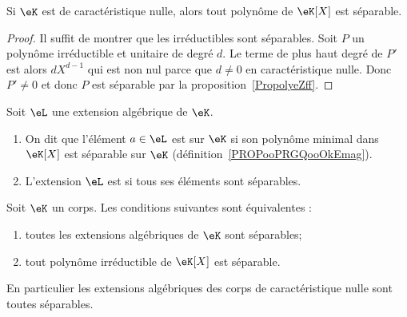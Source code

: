 \begin{corollary}   \label{CorUjfJSE}
	Si \( \eK\) est de caractéristique nulle, alors tout polynôme de \( \eK[X]\) est séparable.
\end{corollary}

\begin{proof}
	Il suffit de montrer que les irréductibles sont séparables. Soit \( P\) un polynôme irréductible et unitaire de degré \( d\). Le terme de plus haut degré de \( P'\) est alors \( dX^{d-1}\) qui est non nul parce que \( d\neq 0\) en caractéristique nulle. Donc \( P'\neq 0\) et donc \( P\) est séparable par la proposition~\ref{PropolyeZff}.
\end{proof}

\begin{definition}      \label{DEFooKTVHooTydOTM}
	Soit \( \eL\) une extension algébrique de \( \eK\).
	\begin{enumerate}
		\item       \label{ITEMooOFYPooLYkIPr}
		      On dit que l'élément \( a\in \eL\) est  sur \( \eK\) si son polynôme minimal dans \( \eK[X]\) est séparable sur \( \eK\) (définition~\ref{PROPooPRGQooOkEmag}).
		\item
		      L'extension \( \eL\) est  si tous ses éléments sont séparables.
	\end{enumerate}
\end{definition}

\begin{proposition} \label{PropUmxJVw}
	Soit \( \eK\) un corps. Les conditions suivantes sont équivalentes :
	\begin{enumerate}
		\item       \label{ITEMooUSKRooDmsGmw}
		      toutes les extensions algébriques de \( \eK\) sont séparables;
		\item       \label{ITEMooJGWLooKInxSG}
		      tout polynôme irréductible de \( \eK[X]\) est séparable.
	\end{enumerate}
	En particulier les extensions algébriques des corps de caractéristique nulle sont toutes séparables.
\end{proposition}

